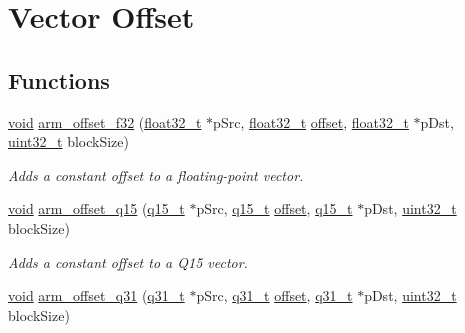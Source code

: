 \hypertarget{group__offset}{\section{Vector Offset}
\label{group__offset}
}
\subsection*{Functions}
\begin{DoxyCompactItemize}
\item 
\hyperlink{group___n_a_m_e_ga18028b8badbf1ea7e704ccac3c488e82}{void} \hyperlink{group__offset_ga989dfae15235799d82f62ef9d356abb4}{arm\-\_\-offset\-\_\-f32} (\hyperlink{arm__math_8h_a4611b605e45ab401f02cab15c5e38715}{float32\-\_\-t} $\ast$p\-Src, \hyperlink{arm__math_8h_a4611b605e45ab401f02cab15c5e38715}{float32\-\_\-t} \hyperlink{group___copter_control_b_l_gaa9fff43968831437a312428836cab362}{offset}, \hyperlink{arm__math_8h_a4611b605e45ab401f02cab15c5e38715}{float32\-\_\-t} $\ast$p\-Dst, \hyperlink{stdint_8h_a435d1572bf3f880d55459d9805097f62}{uint32\-\_\-t} block\-Size)
\begin{DoxyCompactList}\small\item\em Adds a constant offset to a floating-\/point vector. \end{DoxyCompactList}\item 
\hyperlink{group___n_a_m_e_ga18028b8badbf1ea7e704ccac3c488e82}{void} \hyperlink{group__offset_gab4c1d2391b599549e5a06fdfbc2747bf}{arm\-\_\-offset\-\_\-q15} (\hyperlink{arm__math_8h_ab5a8fb21a5b3b983d5f54f31614052ea}{q15\-\_\-t} $\ast$p\-Src, \hyperlink{arm__math_8h_ab5a8fb21a5b3b983d5f54f31614052ea}{q15\-\_\-t} \hyperlink{group___copter_control_b_l_gaa9fff43968831437a312428836cab362}{offset}, \hyperlink{arm__math_8h_ab5a8fb21a5b3b983d5f54f31614052ea}{q15\-\_\-t} $\ast$p\-Dst, \hyperlink{stdint_8h_a435d1572bf3f880d55459d9805097f62}{uint32\-\_\-t} block\-Size)
\begin{DoxyCompactList}\small\item\em Adds a constant offset to a Q15 vector. \end{DoxyCompactList}\item 
\hyperlink{group___n_a_m_e_ga18028b8badbf1ea7e704ccac3c488e82}{void} \hyperlink{group__offset_gac84ec42cbbebc5c197a87d0221819acf}{arm\-\_\-offset\-\_\-q31} (\hyperlink{arm__math_8h_adc89a3547f5324b7b3b95adec3806bc0}{q31\-\_\-t} $\ast$p\-Src, \hyperlink{arm__math_8h_adc89a3547f5324b7b3b95adec3806bc0}{q31\-\_\-t} \hyperlink{group___copter_control_b_l_gaa9fff43968831437a312428836cab362}{offset}, \hyperlink{arm__math_8h_adc89a3547f5324b7b3b95adec3806bc0}{q31\-\_\-t} $\ast$p\-Dst, \hyperlink{stdint_8h_a435d1572bf3f880d55459d9805097f62}{uint32\-\_\-t} block\-Size)

\end{DoxyCompactItemize}
